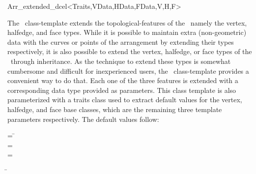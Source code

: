 
\ccRefPageBegin

\begin{ccRefClass}{Arr_extended_dcel<Traits,VData,HData,FData,V,H,F>}

\ccDefinition
The \ccRefName\ class-template extends the topological-features of the \dcel\,
namely the vertex, halfedge, and face types. While it is possible to maintain
extra (non-geometric) data with the curves or points of the arrangement by
extending their types respectively, it is also possible to extend the vertex,
halfedge, or face types of the \dcel\ through inheritance. As the technique to
extend these types is somewhat cumbersome and difficult for inexperienced
users, the \ccRefName\ class-template provides a convenient way to do that.
Each one of the three features is extended with a corresponding data type
provided as parameters. This class template is also parameterized with a
traits class used to extract default values for the vertex, halfedge, and face
base classes, which are the remaining three template parameters respectively.
The default values follow:

\begin{tabbing}
 = \=\\
 = \>\\
 = \>
\end{tabbing}


\ccIsModel

\ccInheritsFrom
  \begin{tabbing}
  \=\\
                      \>\\
                      \>
  \end{tabbing}

\ccSeeAlso


\end{ccRefClass}

\ccRefPageEnd
